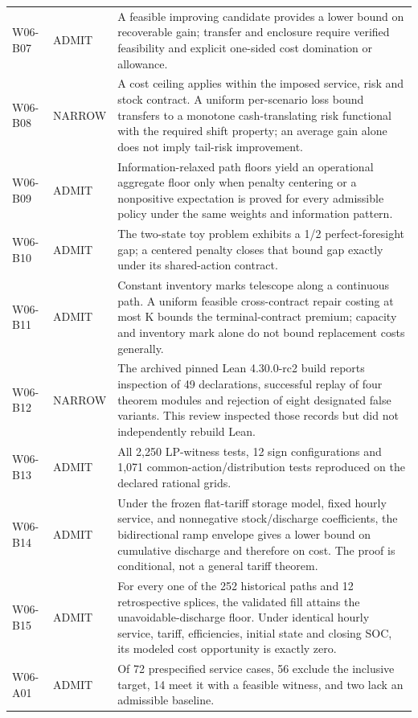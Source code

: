 \documentclass[11pt,letterpaper]{article}
\begin{document}
\begin{longtable}{P{.12\linewidth}P{.12\linewidth}P{.66\linewidth}}
W06-B07 & ADMIT & A feasible improving candidate provides a lower bound on recoverable gain; transfer and enclosure require verified feasibility and explicit one-sided cost domination or allowance.\\
W06-B08 & NARROW & A cost ceiling applies within the imposed service, risk and stock contract. A uniform per-scenario loss bound transfers to a monotone cash-translating risk functional with the required shift property; an average gain alone does not imply tail-risk improvement.\\
W06-B09 & ADMIT & Information-relaxed path floors yield an operational aggregate floor only when penalty centering or a nonpositive expectation is proved for every admissible policy under the same weights and information pattern.\\
W06-B10 & ADMIT & The two-state toy problem exhibits a 1/2 perfect-foresight gap; a centered penalty closes that bound gap exactly under its shared-action contract.\\
W06-B11 & ADMIT & Constant inventory marks telescope along a continuous path. A uniform feasible cross-contract repair costing at most K bounds the terminal-contract premium; capacity and inventory mark alone do not bound replacement costs generally.\\
W06-B12 & NARROW & The archived pinned Lean 4.30.0-rc2 build reports inspection of 49 declarations, successful replay of four theorem modules and rejection of eight designated false variants. This review inspected those records but did not independently rebuild Lean.\\
W06-B13 & ADMIT & All 2,250 LP-witness tests, 12 sign configurations and 1,071 common-action/distribution tests reproduced on the declared rational grids.\\
W06-B14 & ADMIT & Under the frozen flat-tariff storage model, fixed hourly service, and nonnegative stock/discharge coefficients, the bidirectional ramp envelope gives a lower bound on cumulative discharge and therefore on cost. The proof is conditional, not a general tariff theorem.\\
W06-B15 & ADMIT & For every one of the 252 historical paths and 12 retrospective splices, the validated fill attains the unavoidable-discharge floor. Under identical hourly service, tariff, efficiencies, initial state and closing SOC, its modeled cost opportunity is exactly zero.\\
W06-A01 & ADMIT & Of 72 prespecified service cases, 56 exclude the inclusive target, 14 meet it with a feasible witness, and two lack an admissible baseline.\\

\end{longtable}
\end{document}
